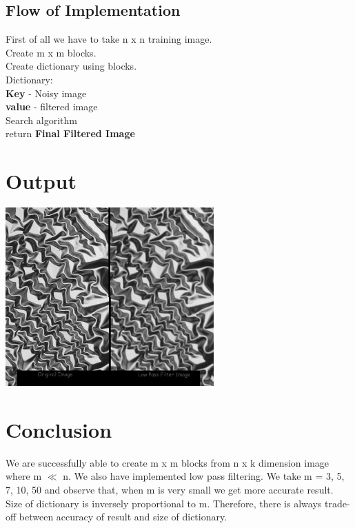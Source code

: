 \documentclass[journal]{IEEEtran}
\begin{document}
	\subsection{\textbf{Flow of Implementation}}
	
	
	\begin{algorithm}
	First of all we have to take n x n training
	image.\\
		Create m x m blocks.\\
		Create dictionary using blocks.\\
		Dictionary:\\
		\hspace{1cm}	 \textbf{Key} - Noisy image\\
		\hspace{1cm}	 \textbf{value} - filtered image\\
		Search algorithm\\
	return \textbf{Final Filtered Image}
	
\end{algorithm}

	


	
	\ifCLASSOPTIONcaptionsoff
	\newpage
	\fi
	
	\section{\textbf{Output}}
	    \begin{minipage}{\linewidth}
	    	\centering
	    	\includegraphics[width=80mm]{3.jpg}
	    \end{minipage} 
	\section{\textbf{Conclusion}}
	We are successfully able to create m x m blocks from n x k dimension image where m $\ll$ n. We also have implemented low pass filtering. We take m = 3, 5, 7, 10, 50 and observe that, when m is very small we get more accurate result. Size of dictionary is inversely proportional to m. Therefore, there is always trade-off between accuracy of result and size of dictionary.   
	
\end{document}
